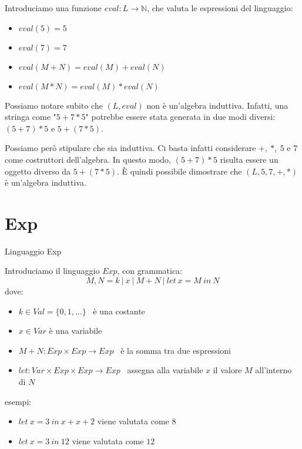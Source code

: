 \documentclass[a4paper,11pt]{report}
\begin{document}
Introduciamo una funzione \( eval : L \to \mathbb{N}\), che valuta le espressioni del linguaggio:
\begin{itemize}
    \item \(eval(5) = 5\)
    \item \( eval(7) = 7 \)
    \item \( eval(M+N) = eval(M)+eval(N)\)
    \item \( eval(M*N) = eval(M)*eval(N)\)
\end{itemize}

Possiamo notare subito che \( (L, eval) \) non è un'algebra induttiva. Infatti, una stringa come "\( 5 + 7 * 5 \)" potrebbe essere stata generata in due modi diversi: \( (5 + 7) * 5 \) e \( 5 + (7 * 5) \). 

Possiamo però stipulare che sia induttiva. Ci basta infatti considerare \( +, \ *, \ 5\) e \( 7 \) come costruttori dell'algebra. In questo modo, \( (5 + 7) * 5 \) risulta essere un oggetto diverso da \( 5 + (7 * 5) \). È quindi possibile dimostrare che \( (L, 5, 7, +, *) \) è un'algebra induttiva.

\section{Exp}

\begin{defbox}{Linguaggio Exp}{}

    Introduciamo il linguaggio \( Exp \), con grammatica:
    \[
        M, N = k \ | \ x \ | \ M + N \ | \ let \ x = M \ in \ N
    \]
    dove:

    \begin{itemize}
        \item \( k \in Val=\{0, 1, \dots\}\) \ è una costante
        \item \( x \in Var \) è una variabile     
        \item \( M + N : Exp \times Exp \to Exp \) \ è la somma tra due espressioni
        \item \(  let : Var \times Exp \times Exp \to Exp\) \ assegna alla variabile \( x \)
            il valore \( M \) all'interno di \( N \)
    \end{itemize}

\end{defbox}

\vspace{3em}
esempi:
\begin{itemize}
    \item \( let \ x = 3 \ in \ x+x+2 \) viene valutata come \( 8 \)
    \item \( let \ x = 3 \ in \ 12 \) viene valutata come \( 12 \)
\end{itemize}
\end{document}
